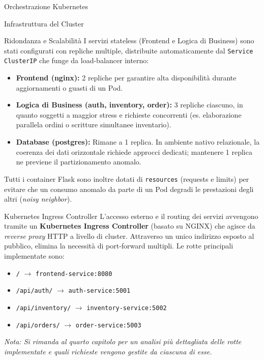 \begin{mychapter}{Orchestrazione Kubernetes}
\begin{mysection}{Infrastruttura del Cluster}
\begin{mysubsection}{Ridondanza e Scalabilità}
I servizi stateless (Frontend e Logica di Business) sono stati configurati con repliche multiple, distribuite automaticamente dal \texttt{Service} \texttt{ClusterIP} che funge da load-balancer interno:
\begin{itemize}
    \item \textbf{Frontend (nginx):} 2 repliche per garantire alta disponibilità durante aggiornamenti o guasti di un Pod.
    \item \textbf{Logica di Business (auth, inventory, order):} 3 repliche ciascuno, in quanto soggetti a maggior stress e richieste concorrenti (es. elaborazione parallela ordini o scritture simultanee inventario).
    \item \textbf{Database (postgres):} Rimane a 1 replica. In ambiente nativo relazionale, la coerenza dei dati orizzontale richiede approcci dedicati; mantenere 1 replica ne previene il partizionamento anomalo.
\end{itemize}

Tutti i container Flask sono inoltre dotati di \texttt{resources} (requests e limits) per evitare che un consumo anomalo da parte di un Pod degradi le prestazioni degli altri (\textit{noisy neighbor}).
\end{mysubsection}

\begin{mysubsection}{Kubernetes Ingress Controller}
L'accesso esterno e il routing dei servizi avvengono tramite un \textbf{Kubernetes Ingress Controller} (basato su NGINX) che agisce da \textit{reverse proxy} HTTP a livello di cluster. Attraverso un unico indirizzo esposto al pubblico, elimina la necessità di port-forward multipli. Le rotte principali implementate sono:
\begin{itemize}
    \item \texttt{/} $\rightarrow$ \texttt{frontend-service:8080}
    \item \texttt{/api/auth/} $\rightarrow$ \texttt{auth-service:5001}
    \item \texttt{/api/inventory/} $\rightarrow$ \texttt{inventory-service:5002}
    \item \texttt{/api/orders/} $\rightarrow$ \texttt{order-service:5003}
\end{itemize}

\textit{Nota: Si rimanda al quarto capitolo per un analisi più dettagliata delle rotte implementate e quali richieste vengono gestite da ciascuna di esse.}
\end{mysubsection}


\end{mysection}
\end{mychapter}
